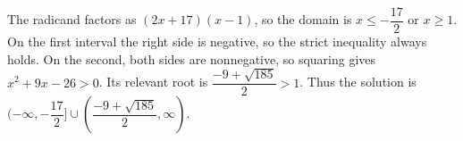 The radicand factors as $(2x+17)(x-1)$, so the domain is $x\le-\dfrac{17}{2}$ or $x\ge1$. On the first interval the right side is negative, so the strict inequality always holds. On the second, both sides are nonnegative, so squaring gives $x^2+9x-26>0$. Its relevant root is $\dfrac{-9+\sqrt{185}}{2}>1$. Thus the solution is $\boxed{(-\infty,-\dfrac{17}{2}]\cup(\dfrac{-9+\sqrt{185}}{2},\infty)}$.
